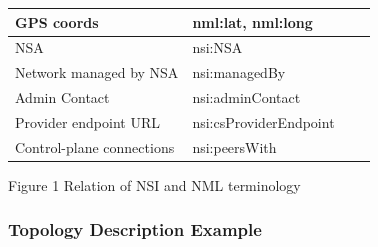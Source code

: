 \documentclass{article}
\begin{document}
\begin{longtable}{|p{1.939in}|p{2.443in}|p{0.059in}|p{0.059in}|}
\begin{minipage}[t]{0.059in}\centering  GPS coords\end{minipage} & \begin{minipage}[t]{0.059in}\centering  nml:lat, 
nml:long\end{minipage}\\
\hline
\begin{minipage}[t]{1.939in}\centering  NSA\end{minipage} & \begin{minipage}[t]{2.443in}\centering  nsi:NSA\end{minipage}\\
\hline
\begin{minipage}[t]{0.059in}\centering  Network managed by NSA\end{minipage} & \begin{minipage}[t]{0.059in}\centering  nsi:managedBy\end{minipage}\\
\hline
\begin{minipage}[t]{1.939in}\centering  Admin Contact\end{minipage} & \begin{minipage}[t]{2.443in}\centering  nsi:adminContact\end{minipage}\\
\hline
\begin{minipage}[t]{0.059in}\centering  Provider endpoint URL\end{minipage} & \begin{minipage}[t]{0.059in}\centering  nsi:csProviderEndpoint\end{minipage}\\
\hline
\begin{minipage}[t]{1.939in}\centering  Control-plane connections\end{minipage} & \begin{minipage}[t]{2.443in}\centering  nsi:peersWith\end{minipage}\\
\hline
\end{longtable}

\begin{center}
 Figure 1 Relation of NSI and NML terminology
\end{center}


\subsubsection{Topology Description Example}
\end{document}
